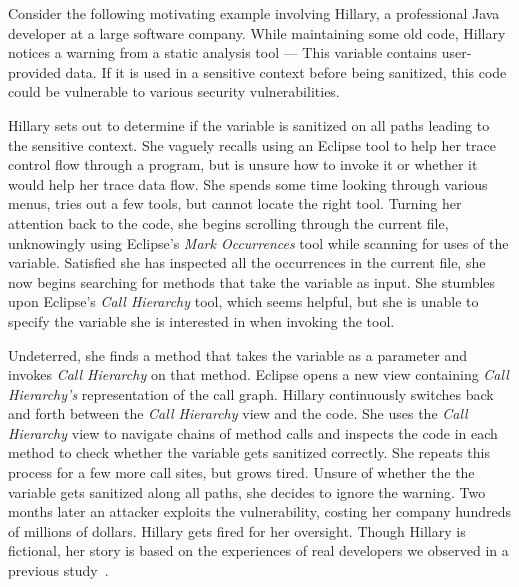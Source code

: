 \documentclass[conference]{IEEEtran}
\begin{document}

Consider the following motivating example involving Hillary, a professional Java developer at a large software company.
While maintaining some old code, Hillary notices a warning from a static analysis tool --- This variable contains user-provided data. 
If it is used in a sensitive context before being sanitized, this code could be vulnerable to various security vulnerabilities.

Hillary sets out to determine if the variable is sanitized on all paths leading to the sensitive context.
She vaguely recalls using an Eclipse tool to help her trace control flow through a program, but is unsure how to invoke it or whether it would help her trace data flow.
She spends some time looking through various menus, tries out a few tools, but cannot locate the right tool.
Turning her attention back to the code, she begins scrolling through the current file, unknowingly using Eclipse's \emph{Mark Occurrences} tool while scanning for uses of the variable. 
Satisfied she has inspected all the occurrences in the current file, she now begins searching for methods that take the variable as input.
She stumbles upon Eclipse's \emph{Call Hierarchy} tool, which seems helpful, but she is unable to specify the variable she is interested in when invoking the tool.

Undeterred, she finds a method that takes the variable as a parameter and invokes \emph{Call Hierarchy} on that method.
Eclipse opens a new view containing \emph{Call Hierarchy's} representation of the call graph.
Hillary continuously switches back and forth between the \emph{Call Hierarchy} view and the code.
She uses the \emph{Call Hierarchy} view to navigate chains of method calls and inspects the code in each method to check whether the variable gets sanitized correctly.
She repeats this process for a few more call sites, but grows tired. 
Unsure of whether the the variable gets sanitized along all paths, she decides to ignore the warning.
Two months later an attacker exploits the vulnerability, costing her company hundreds of millions of dollars. 
Hillary gets fired for her oversight. 
Though Hillary is fictional, her story is based on the experiences of real developers we observed in a previous study~\cite{Smith2015}.
\end{document}

